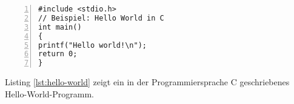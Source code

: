 \documentclass[12pt,a5paper]{scrbook}
\begin{document}
	
\begin{lstlisting}[numbers=left, language={[ansi]C}, caption={Hello World in C}, label=lst:hello-world]
#include <stdio.h>
// Beispiel: Hello World in C
int main()
{
printf("Hello world!\n");
return 0;
}
\end{lstlisting}

Listing \ref{lst:hello-world} zeigt ein in der Programmiersprache C geschriebenes Hello-World-Programm.
\end{document}
